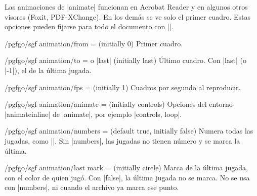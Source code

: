 Las animaciones de |animate| funcionan en Acrobat Reader y en algunos otros visores (Foxit, PDF-XChange). En los demás se ve solo el primer cuadro. Estas opciones pueden fijarse para todo el documento con ||.

\begin{codeexample}[width=5cm]
\end{codeexample}

\begin{key}{/pgfgo/sgf animation/from =  (initially 0)}
	Primer cuadro.
\end{key}

\begin{key}{/pgfgo/sgf animation/to =  o |last| (initially last)}
	Último cuadro. Con |last| (o |-1|), el de la última jugada.
\end{key}

\begin{key}{/pgfgo/sgf animation/fps =  (initially 1)}
	Cuadros por segundo al reproducir.
\end{key}


\begin{key}{/pgfgo/sgf animation/animate =  (initially controls)}
	Opciones del entorno |animateinline| de |animate|, por ejemplo |controls, loop|.
\end{key}

\begin{key}{/pgfgo/sgf animation/numbers =  (default true, initially false)}
	Numera todas las jugadas, como |\sgf|. Sin |numbers|, las jugadas no tienen número y se marca la última.

	\begin{codeexample}[width=5cm]
	\end{codeexample}
\end{key}

\begin{key}{/pgfgo/sgf animation/last mark =  (initially circle)}
	Marca de la última jugada, con el color de quien jugó. Con |false|, la última jugada no se marca. No se usa con |numbers|, ni cuando el archivo ya marca ese punto.

	\begin{codeexample}[width=5cm]
	\end{codeexample}
\end{key}

